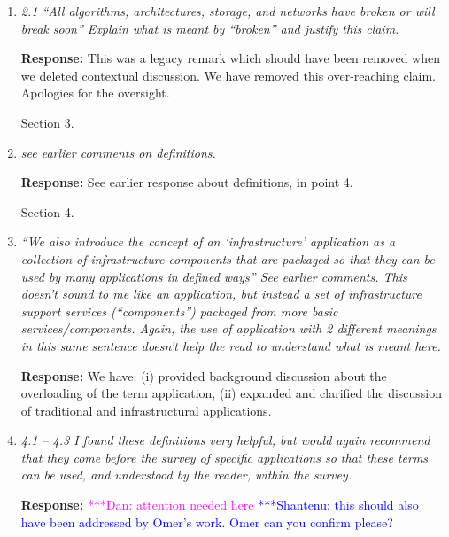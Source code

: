 \documentclass{article}
\newcommand{\katznote}[1]{{\textcolor{magenta} { ***Dan: #1 }}}
\newcommand{\jhanote}[1]{ {\textcolor{blue} { ***Shantenu: #1 }}}
\newcommand{\katznote}[1]{}
\newcommand{\jhanote}[1]{}
\begin{document}
\begin{enumerate}
\textbf{Response:} \katznote{attention needed here}\jhanote{this should also have been addressed by Omer's work. Omer can you confirm please?}

\item \emph{2.1 ``All algorithms, architectures, storage, and networks have broken or will break soon'' Explain what is meant by ``broken'' and justify this claim.} 

  \textbf{Response:} This was a legacy remark which should have been removed when we deleted contextual discussion. We have removed this over-reaching claim. Apologies for the oversight.

\hspace{-0.7cm}Section 3. 

\item \emph{see earlier comments on definitions.} 

\textbf{Response:} See earlier response about definitions, in point 4.

\hspace{-0.7cm}Section 4. 

\item \emph{``We also introduce the concept of an `infrastructure' application as a collection of infrastructure components that are packaged so that they can be used by many applications in defined ways'' See earlier comments. This doesn't sound to me like an application, but instead a set of infrastructure support services (``components'') packaged from more basic services/components. Again, the use of application with 2 different meanings in this same sentence doesn't help the read to understand what is meant here.}

  \textbf{Response:} We have: (i) provided background discussion about the overloading of the term application, (ii) expanded and clarified the discussion of traditional and infrastructural applications.

\item \emph{4.1 -- 4.3 I found these definitions very helpful, but would again recommend that they come before the survey of specific applications so that these terms can be used, and understood by the reader, within the survey.}

  \textbf{Response:} \katznote{attention needed here}\jhanote{this should also have been addressed by Omer's work. Omer can you confirm please?}

\end{enumerate}

\end{document}
